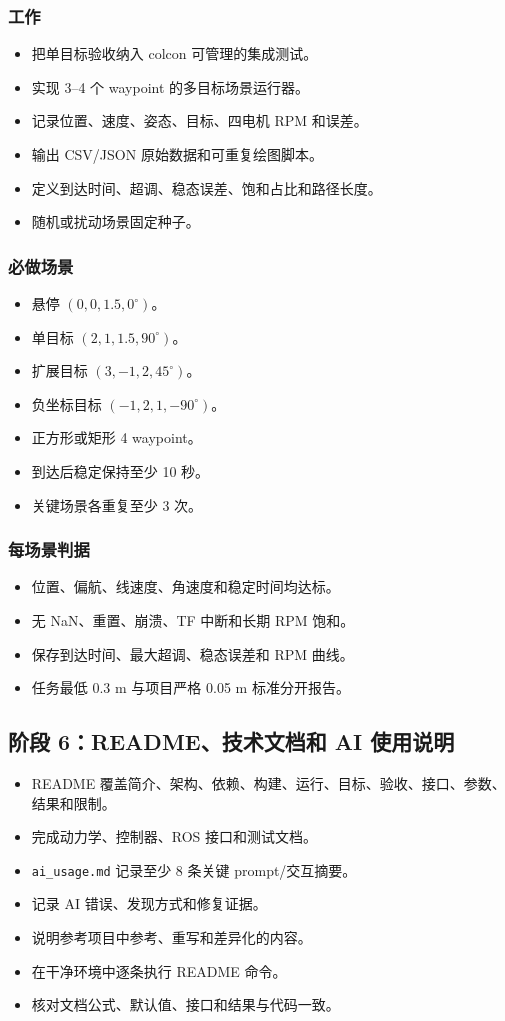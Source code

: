 \documentclass[UTF8,a4paper,12pt,fontset=fandol]{ctexart}
\newcommand{\unchecked}{\(\square\)}
\newcommand{\workitem}[1]{\item[\unchecked] #1}
\newcommand{\code}[1]{\texttt{#1}}
\begin{document}
\subsubsection{工作}
\begin{itemize}
  \workitem{把单目标验收纳入 colcon 可管理的集成测试。}
  \workitem{实现 3--4 个 waypoint 的多目标场景运行器。}
  \workitem{记录位置、速度、姿态、目标、四电机 RPM 和误差。}
  \workitem{输出 CSV/JSON 原始数据和可重复绘图脚本。}
  \workitem{定义到达时间、超调、稳态误差、饱和占比和路径长度。}
  \workitem{随机或扰动场景固定种子。}
\end{itemize}

\subsubsection{必做场景}
\begin{itemize}
  \workitem{悬停 \((0,0,1.5,0^\circ)\)。}
  \workitem{单目标 \((2,1,1.5,90^\circ)\)。}
  \workitem{扩展目标 \((3,-1,2,45^\circ)\)。}
  \workitem{负坐标目标 \((-1,2,1,-90^\circ)\)。}
  \workitem{正方形或矩形 4 waypoint。}
  \workitem{到达后稳定保持至少 10 秒。}
  \workitem{关键场景各重复至少 3 次。}
\end{itemize}

\subsubsection{每场景判据}
\begin{itemize}
  \workitem{位置、偏航、线速度、角速度和稳定时间均达标。}
  \workitem{无 NaN、重置、崩溃、TF 中断和长期 RPM 饱和。}
  \workitem{保存到达时间、最大超调、稳态误差和 RPM 曲线。}
  \workitem{任务最低 0.3 m 与项目严格 0.05 m 标准分开报告。}
\end{itemize}

\subsection{阶段 6：README、技术文档和 AI 使用说明}

\begin{itemize}
  \workitem{README 覆盖简介、架构、依赖、构建、运行、目标、验收、接口、参数、结果和限制。}
  \workitem{完成动力学、控制器、ROS 接口和测试文档。}
  \workitem{\code{ai\_usage.md} 记录至少 8 条关键 prompt/交互摘要。}
  \workitem{记录 AI 错误、发现方式和修复证据。}
  \workitem{说明参考项目中参考、重写和差异化的内容。}
  \workitem{在干净环境中逐条执行 README 命令。}
  \workitem{核对文档公式、默认值、接口和结果与代码一致。}
\end{itemize}
\end{document}
